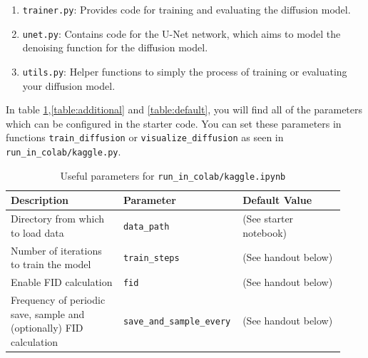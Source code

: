 \documentclass[11pt,addpoints,answers]{exam}
\begin{document}
\begin{questions}
\begin{enumerate}
    \item \lstinline{trainer.py}: Provides code for training and evaluating the diffusion model.
    
    \item \lstinline{unet.py}: Contains code for the U-Net network, which aims to model the denoising function for the diffusion model.

    \item \lstinline{utils.py}: Helper functions to simply the process of training or evaluating your diffusion model.
    
\end{enumerate}



In table \ref{table:flag},\ref{table:additional} and \ref{table:default}, you will find all of the parameters which can be configured in the starter code. You can set these parameters in functions \lstinline{train_diffusion} or \lstinline{visualize_diffusion} as seen in \lstinline{run_in_colab/kaggle.py}.



\begin{table}[H]
\centering
\begin{tabular}{|p{0.33\linewidth}|p{0.3\linewidth}|p{0.3\linewidth}|}
\hline
Description & Parameter & Default Value \\ \hline
Directory from which to load data &  \lstinline|data_path| & (See starter notebook) \\ \hline
Number of iterations to train the model &  \lstinline|train_steps| & (See handout below) \\ \hline
Enable FID calculation  &  \lstinline|fid| & (See handout below) \\ \hline
Frequency of periodic save, sample and (optionally) FID calculation  &  \lstinline|save_and_sample_every| & (See handout below) \\ \hline

\end{tabular}
\caption{Useful parameters for \lstinline{run_in_colab/kaggle.ipynb}}
\label{table:flag}
\end{table}

\vspace{-1em}


\end{questions}
\end{document}
